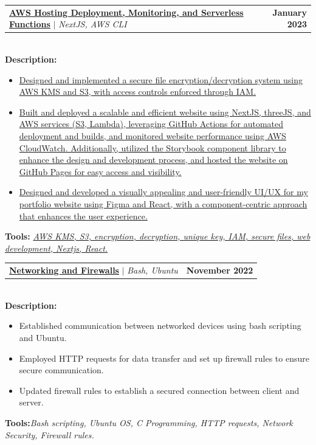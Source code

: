 \documentclass[letterpaper,11pt]{article}
\makeatletter
\newcommand{\resumeItem}[1]{
  \item\small{
    {#1 \vspace{-2pt}}
  }
}
\newcommand{\resumeProjectHeading}[2]{
    \item
    \begin{tabular*}{1.001\textwidth}{l@{\extracolsep{\fill}}r}
      \small#1 & \textbf{\small #2}\\
    \end{tabular*}\vspace{-7pt}
}
\newcommand{\resumeItemListStart}{\begin{itemize}}
\newcommand{\resumeItemListEnd}{\end{itemize}\vspace{-5pt}}
\makeatother
\begin{document}
          \resumeProjectHeading
          {\href{https://yakkshit.com}{\textbf{AWS Hosting Deployment, Monitoring, and Serverless Functions}} $|$ \emph{NextJS, AWS CLI}}{January 2023}\\
          \vspace{6pt}
          \textbf{Description:}
          
          \vspace{-5pt}
          \resumeItemListStart
            \resumeItem{\href{https://yakkshit.com}{Designed and implemented a secure file encryption/decryption system using AWS KMS and S3, with access controls enforced through IAM.}}
            \resumeItem{\href{https://yakkshit.com}{Built and deployed a scalable and efficient website using NextJS, threeJS, and AWS services (S3, Lambda), leveraging GitHub Actions for automated deployment and builds, and monitored website performance using AWS CloudWatch. Additionally, utilized the Storybook component library to enhance the design and development process, and hosted the website on GitHub Pages for easy access and visibility.}}
            \resumeItem{\href{https://yakkshit.com}{Designed and developed a visually appealing and user-friendly UI/UX for my portfolio website using Figma and React, with a component-centric approach that enhances the user experience.}}
          \resumeItemListEnd
          \vspace{-2pt}
          \textbf{Tools:}\emph{ \href{https://yakkshit.com}{AWS KMS, S3, encryption, decryption, unique key, IAM, secure files, web development, Nextjs, React.}}
          \vspace{-18pt}
          \resumeProjectHeading
          {\textbf{\href{https://github.com/saiyakkshit?tab=repositories}{Networking and Firewalls}} $|$ \emph{Bash, Ubuntu}}{November 2022}\\
          \vspace{6pt}
          \textbf{Description:}
           \vspace{-5pt}
          \resumeItemListStart
            \resumeItem{Established communication between networked devices using bash scripting and Ubuntu.}
            \resumeItem{Employed HTTP requests for data transfer and set up firewall rules to ensure secure communication.}
            \resumeItem{Updated firewall rules to establish a secured connection between client and server.}           
          \resumeItemListEnd 
          \textbf{Tools:}\emph{Bash scripting,
Ubuntu OS,
C Programming,
HTTP requests, Network Security,
Firewall rules.}
          \vspace{-18pt}
\end{document}
